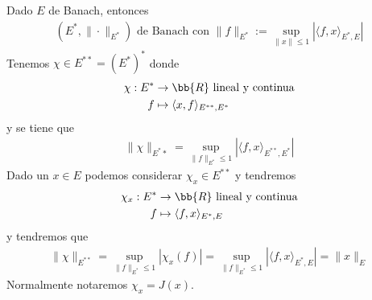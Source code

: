 \begin{definicion}
    Dado $E$ de Banach, entonces 
    \begin{gather*}
        (E^*, \|\cdot\|_{E^*})\text{ de Banach con } \|f\|_{E^*}:=\sup_{\|x\|\leq 1} |\langle f,x \rangle_{E^*, E} |
    \end{gather*}
    Tenemos $\chi\in E^{**}=(E^*)^*$ donde
    \begin{align*}
        \chi: E^* &\to \bb{R} \text{ lineal y continua}\\
        f & \mapsto \langle x,f \rangle_{E^{**}, E^*}
    \end{align*}
    y se tiene que 
    \begin{gather*}
        \|\chi\|_{E^**} = \sup_{\|f\|_{E^*}\leq 1} |\langle f,x \rangle_{E^{**}, E^*}|
    \end{gather*}
    Dado un $x\in E$ podemos considerar $\chi_x\in E^{**}$ y tendremos
    \begin{align*}
        \chi_x : E^* & \to \bb{R} \text{ lineal y continua}\\
        f & \mapsto \langle f, x \rangle_{E^*, E}
    \end{align*}
    y tendremos que 
    \begin{gather*}
        \|\chi\|_{E^{**}} = \sup_{\|f\|_{E^*}\leq 1} |\chi_x(f)| = \sup_{\|f\|_{E^*}\leq 1} |\langle f,x \rangle_{E^{*}, E}| = \|x\|_E
    \end{gather*}
    Normalmente notaremos $\chi_x = J(x)$.
\end{definicion}




